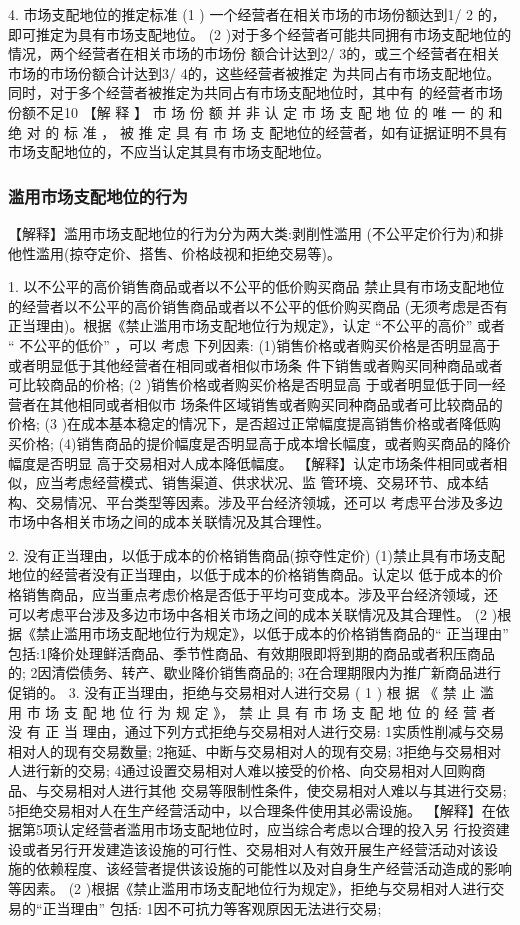 \documentclass[UTF8,12pt]{ctexart}
\numberwithin{equation}{section} %
\numberwithin{figure}{section}
\numberwithin{table}{section}
\begin{document}
	4. 市场支配地位的推定标准
	(1 ) 一个经营者在相关市场的市场份额达到1/ 2 的，即可推定为具有市场支配地位。
	(2 )对于多个经营者可能共同拥有市场支配地位的情况，两个经营者在相关市场的市场份 额合计达到2/ 3的，或三个经营者在相关市场的市场份额合计达到3/ 4的，这些经营者被推定 为共同占有市场支配地位。同时，对于多个经营者被推定为共同占有市场支配地位时，其中有 的经营者市场份额不足10%
	【解 释 】 市 场 份 额 并 非 认 定 市 场 支 配 地 位 的 唯 一 的 和 绝 对 的 标 准 ， 被 推 定 具 有 市 场 支 配地位的经营者，如有证据证明不具有市场支配地位的，不应当认定其具有市场支配地位。
	
	\subsubsection{滥用市场支配地位的行为}
	【解释】滥用市场支配地位的行为分为两大类:剥削性滥用 (不公平定价行为)和排 他性滥用(掠夺定价、搭售、价格歧视和拒绝交易等)。
	
	
	1. 以不公平的高价销售商品或者以不公平的低价购买商品 禁止具有市场支配地位的经营者以不公平的高价销售商品或者以不公平的低价购买商品 (无须考虑是否有正当理由)。根据《禁止滥用市场支配地位行为规定》，认定 “不公平的高价” 或者 “ 不公平的低价” ，可以 考虑 下列因素: (1)销售价格或者购买价格是否明显高于或者明显低于其他经营者在相同或者相似市场条 件下销售或者购买同种商品或者可比较商品的价格;
	(2 )销售价格或者购买价格是否明显高 于或者明显低于同一经营者在其他相同或者相似市 场条件区域销售或者购买同种商品或者可比较商品的价格;
	(3 )在成本基本稳定的情况下，是否超过正常幅度提高销售价格或者降低购买价格; (4)销售商品的提价幅度是否明显高于成本增长幅度，或者购买商品的降价幅度是否明显 高于交易相对人成本降低幅度。
	【解释】认定市场条件相同或者相似，应当考虑经营模式、销售渠道、供求状况、监 管环境、交易环节、成本结构、交易情况、平台类型等因素。涉及平台经济领城，还可以 考虑平台涉及多边市场中各相关市场之间的成本关联情况及其合理性。
	
	2. 没有正当理由，以低于成本的价格销售商品(掠夺性定价) (1)禁止具有市场支配地位的经营者没有正当理由，以低于成本的价格销售商品。认定以 低于成本的价格销售商品，应当重点考虑价格是否低于平均可变成本。涉及平台经济领域，还 可以考虑平台涉及多边市场中各相关市场之间的成本关联情况及其合理性。
	(2 )根据《禁止滥用市场支配地位行为规定》，以低于成本的价格销售商品的“ 正当理由” 包括:1降价处理鲜活商品、季节性商品、有效期限即将到期的商品或者积压商品的; 2因清偿债务、转产、歇业降价销售商品的; 3在合理期限内为推广新商品进行促销的。
	3. 没有正当理由，拒绝与交易相对人进行交易
	( 1 ) 根 据 《 禁 止 滥 用 市 场 支 配 地 位 行 为 规 定 》， 禁 止 具 有 市 场 支 配 地 位 的 经 营 者 没 有 正 当 理由，通过下列方式拒绝与交易相对人进行交易: 1实质性削减与交易相对人的现有交易数量;
	2拖延、中断与交易相对人的现有交易;
	3拒绝与交易相对人进行新的交易; 4通过设置交易相对人难以接受的价格、向交易相对人回购商品、与交易相对人进行其他 交易等限制性条件，使交易相对人难以与其进行交易; 5拒绝交易相对人在生产经营活动中，以合理条件使用其必需设施。
	【解释】在依据第5项认定经营者滥用市场支配地位时，应当综合考虑以合理的投入另 行投资建设或者另行开发建造该设施的可行性、交易相对人有效开展生产经营活动对该设 施的依赖程度、该经营者提供该设施的可能性以及对自身生产经营活动造成的影响等因素。 (2 )根据《禁止滥用市场支配地位行为规定》，拒绝与交易相对人进行交易的“正当理由” 包括: 1因不可抗力等客观原因无法进行交易;
	
\end{document}
